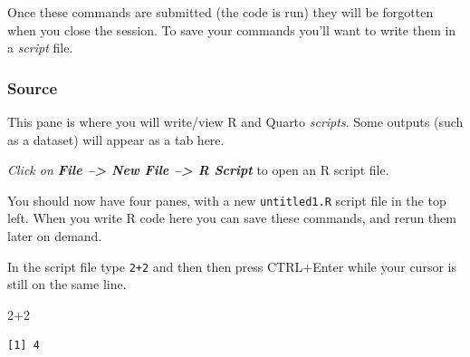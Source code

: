 \documentclass[
  letterpaper,
  DIV=11,
  numbers=noendperiod,
  oneside]{scrreprt}
\newenvironment{Shaded}{\begin{snugshade}}{\end{snugshade}}
\newcommand{\DecValTok}[1]{\textcolor[rgb]{0.68,0.00,0.00}{#1}}
\newcommand{\SpecialCharTok}[1]{\textcolor[rgb]{0.37,0.37,0.37}{#1}}
\begin{document}
Once these commands are submitted (the code is run) they will be
forgotten when you close the session. To save your commands you'll want
to write them in a \emph{script} file.

\subsubsection*{Source}\label{source}

This pane is where you will write/view R and Quarto \emph{scripts}. Some
outputs (such as a dataset) will appear as a tab here.

\begin{tcolorbox}[enhanced jigsaw, bottomrule=.15mm, colback=white, colframe=quarto-callout-tip-color-frame, toprule=.15mm, coltitle=black, rightrule=.15mm, opacitybacktitle=0.6, colbacktitle=quarto-callout-tip-color!10!white, toptitle=1mm, leftrule=.75mm, breakable, bottomtitle=1mm, titlerule=0mm, title={👉 Your Turn}, arc=.35mm, left=2mm, opacityback=0]

\emph{Click on \textbf{File --\textgreater{} New File --\textgreater{} R
Script}} to open an R script file.

\end{tcolorbox}

You should now have four panes, with a new \texttt{untitled1.R} script
file in the top left. When you write R code here you can save these
commands, and rerun them later on demand.

\begin{tcolorbox}[enhanced jigsaw, bottomrule=.15mm, colback=white, colframe=quarto-callout-tip-color-frame, toprule=.15mm, coltitle=black, rightrule=.15mm, opacitybacktitle=0.6, colbacktitle=quarto-callout-tip-color!10!white, toptitle=1mm, leftrule=.75mm, breakable, bottomtitle=1mm, titlerule=0mm, title={👉 Your Turn}, arc=.35mm, left=2mm, opacityback=0]

In the script file type \texttt{2+2} and then then press CTRL+Enter
while your cursor is still on the same line.

\begin{Shaded}
\begin{Highlighting}[numbers=left,,]
\DecValTok{2}\SpecialCharTok{+}\DecValTok{2}
\end{Highlighting}
\end{Shaded}

\begin{verbatim}
[1] 4
\end{verbatim}

\end{tcolorbox}
\end{document}
